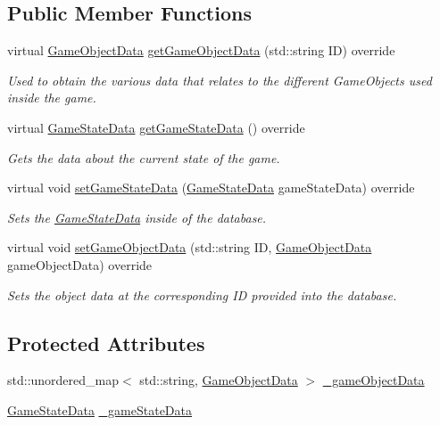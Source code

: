 \subsection*{Public Member Functions}
\begin{DoxyCompactItemize}
\item 
virtual \hyperlink{struct_game_object_data}{Game\+Object\+Data} \hyperlink{class_run_time_database_aabe246e23f6f8ded2c3b61fcfa396f2a}{get\+Game\+Object\+Data} (std\+::string ID) override
\begin{DoxyCompactList}\small\item\em Used to obtain the various data that relates to the different Game\+Objects used inside the game. \end{DoxyCompactList}\item 
virtual \hyperlink{struct_game_state_data}{Game\+State\+Data} \hyperlink{class_run_time_database_a15d6105d3d772f604c42813e50ba4ee3}{get\+Game\+State\+Data} () override
\begin{DoxyCompactList}\small\item\em Gets the data about the current state of the game. \end{DoxyCompactList}\item 
virtual void \hyperlink{class_run_time_database_af18f09a5166adc6ab075034e272e9c8d}{set\+Game\+State\+Data} (\hyperlink{struct_game_state_data}{Game\+State\+Data} game\+State\+Data) override
\begin{DoxyCompactList}\small\item\em Sets the \hyperlink{struct_game_state_data}{Game\+State\+Data} inside of the database. \end{DoxyCompactList}\item 
virtual void \hyperlink{class_run_time_database_a9d2c5c2f1eb4dc728d69b9c5dbd1c22d}{set\+Game\+Object\+Data} (std\+::string ID, \hyperlink{struct_game_object_data}{Game\+Object\+Data} game\+Object\+Data) override
\begin{DoxyCompactList}\small\item\em Sets the object data at the corresponding ID provided into the database. \end{DoxyCompactList}\end{DoxyCompactItemize}
\subsection*{Protected Attributes}
\begin{DoxyCompactItemize}
\item 
std\+::unordered\+\_\+map$<$ std\+::string, \hyperlink{struct_game_object_data}{Game\+Object\+Data} $>$ \hyperlink{class_run_time_database_aec15546ee0f7bf69bd1ba0a74656790d}{\+\_\+game\+Object\+Data}
\item 
\hyperlink{struct_game_state_data}{Game\+State\+Data} \hyperlink{class_run_time_database_a1d965e094a4035d1a6c28a566a29cb8e}{\+\_\+game\+State\+Data}
\end{DoxyCompactItemize}


